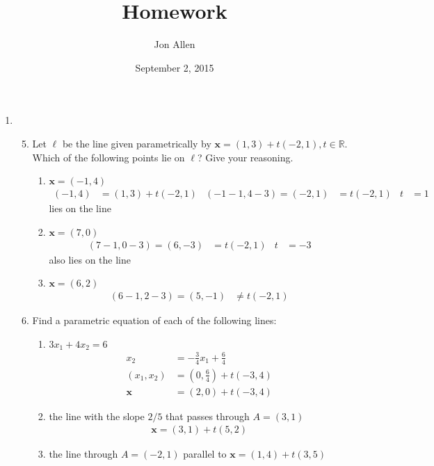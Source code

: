 \documentclass[letterpaper]{article}
\begin{document}
\title{Homework}
\date{September 2, 2015}
\author{Jon Allen}
\maketitle
\renewcommand{\labelenumi}{1.\arabic{enumi}}
\renewcommand{\labelenumii}{\arabic{enumii}.}
\renewcommand{\labelenumiii}{(\alph{enumiii})}
\begin{enumerate}
\item
  \begin{enumerate}
  \setcounter{enumii}{4}
  \item
  Let $\ell$ be the line given parametrically by $\mathbf{x}=(1,3)+t(-2,1),t\in \mathbb{R}$. Which of the following points lie on $\ell$? Give your reasoning.
    \begin{enumerate}
    \item
    $\mathbf{x}=(-1,4)$
    \begin{align*}
      (-1,4)&=(1,3)+t(-2,1) & (-1-1,4-3)=(-2,1)&=t(-2,1) & t&=1
    \end{align*}
    lies on the line
    \item
    $\mathbf{x}=(7,0)$
    \begin{align*}
      (7-1,0-3)=(6,-3)&=t(-2,1)&t&=-3
    \end{align*}
    also lies on the line
    \item
    $\mathbf{x}=(6,2)$
    \begin{align*}
      (6-1,2-3)=(5,-1)&\ne t(-2,1)
    \end{align*}
    \end{enumerate}
  \item
  Find a parametric equation of each of the following lines:
    \begin{enumerate}
    \item
    $3x_1+4x_2=6$
    \begin{align*}
      x_2&=-\frac{3}{4}x_1+\frac{6}{4}\\
      (x_1,x_2)&=(0,\frac{6}{4})+t(-3,4)\\
      \mathbf{x}&=(2,0)+t(-3,4)
    \end{align*}
    \setcounter{enumiii}{2}
    \item
    the line with the slope $2/5$ that passes through $A=(3,1)$
    \begin{align*}
      \mathbf{x}=(3,1)+t(5,2)
    \end{align*}
    \item
    the line through $A=(-2,1)$ parallel to $\mathbf{x}=(1,4)+t(3,5)$

\end{enumerate}
\end{enumerate}
\end{enumerate}
\end{document}
